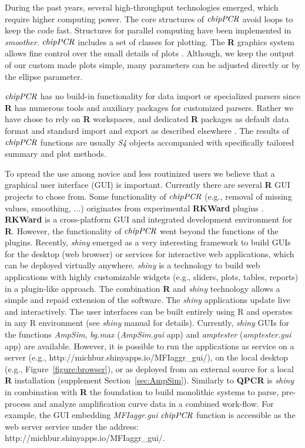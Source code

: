 \documentclass[twocolumn]{bmcart}%
\begin{document}
During the past years, several high-throughput technologies emerged, which 
require higher computing power. The core structures of $\emph{chipPCR}$ avoid 
loops to keep the code fast. Structures for parallel computing have been 
implemented in \textsl{smoother}. $\emph{chipPCR}$ includes a set of classes 
for plotting. The \textbf{R} graphics system allows fine control over the small 
details of plots \cite{Murrell_2012}. Although, we keep the output 
of our custom made plots simple, many parameters can be adjusted directly or by 
the ellipse parameter.

 $\emph{chipPCR}$ has no build-in functionality for data import or specialized 
parsers since \textbf{R} has numerous tools and auxiliary packages for 
customized parsers. Rather we have chose to rely on \textbf{R} workspaces, and 
dedicated \textbf{R} packages as default data format and standard import and 
export as described elsewhere \cite{perkins_2012, RDCT2014c, 
blagodatskikh_2014}. The results of $\emph{chipPCR}$ functions are usually \emph{S4} 
objects accompanied with specifically tailored summary and plot methods.

To spread the use among novice and less routinized users we believe that a 
graphical user interface (GUI) is important. Currently there are several 
\textbf{R} GUI projects \cite{Valero_2012} to chose from. Some functionality of 
$\emph{chipPCR}$ (e.g., removal of missing values, smoothing, ...) originates 
from experimental \textbf{RKWard} plugins \cite{roediger_bead_qPCR_2013, 
roediger_RKWard_2013}. \textbf{RKWard} \cite{rodiger_rkward_2012} is a 
cross-platform GUI and integrated development environment for \textbf{R}. 
However, the functionality of $\emph{chipPCR}$ went beyond the functions of the 
plugins. Recently, \emph{shiny} emerged as a very interesting framework to build 
GUIs for the desktop (web browser) or services for interactive web applications, 
which can be deployed virtually anywhere. \emph{shiny} is a technology to build 
web applications with highly customizable widgets (e.g., sliders, plots, tables, 
reports) in a plugin-like approach. The combination \textbf{R} and \emph{shiny} 
technology allows a simple and repaid extension of the software. The 
\emph{shiny} applications update live and interactively. The user interfaces can 
be built entirely using R and operates in any R environment (see \emph{shiny} 
manual for details). Currently, \emph{shiny} GUIs for the functions 
\textsl{AmpSim}, \textsl{bg.max} (\textsl{AmpSim.gui} app) and 
\textsl{amptester} (\textsl{amptester.gui} app) are available. However, it is 
possible to run the applications as service on a server (e.g., 
http://michbur.shinyapps.io/MFIaggr\_gui/), on the local desktop (e.g., 
Figure~\ref{figure:browser}), or as deployed from an external source for a local 
\textbf{R} installation 
(supplement Section~\ref{sec:AmpSim}). Similarly to 
\textbf{QPCR} \cite{pabinger_2009} is \emph{shiny} in combination with 
\textbf{R} the foundation to build monolithic systems to parse, pre-process and 
analyze amplification curve data in a combined work-flow. For example, the GUI 
embedding \textsl{MFIaggr.gui} $\emph{chipPCR}$ function is accessible as the 
web server service under the address:
http://michbur.shinyapps.io/MFIaggr\_gui/.
\end{document}
